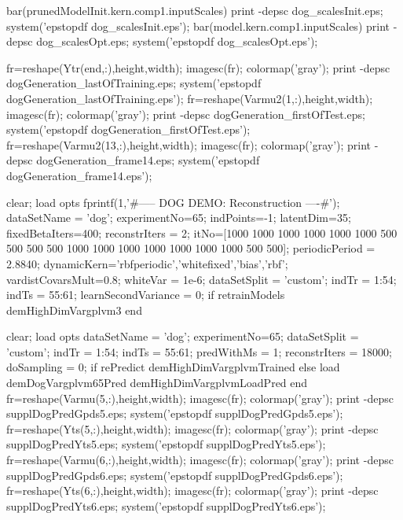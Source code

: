 \begin{matlab}
bar(prunedModelInit.kern.comp{1}.inputScales)
print -depsc dog_scalesInit.eps; system('epstopdf dog_scalesInit.eps');
bar(model.kern.comp{1}.inputScales)
print -depsc dog_scalesOpt.eps; system('epstopdf dog_scalesOpt.eps');

fr=reshape(Ytr(end,:),height,width); imagesc(fr); colormap('gray'); %
print -depsc dogGeneration_lastOfTraining.eps; system('epstopdf dogGeneration_lastOfTraining.eps');
fr=reshape(Varmu2(1,:),height,width); imagesc(fr); colormap('gray');  %
print -depsc dogGeneration_firstOfTest.eps; system('epstopdf dogGeneration_firstOfTest.eps');
fr=reshape(Varmu2(13,:),height,width); imagesc(fr); colormap('gray'); %
print -depsc dogGeneration_frame14.eps; system('epstopdf dogGeneration_frame14.eps');




clear; load opts
fprintf(1,'\n\n#-----  DOG DEMO: Reconstruction ----#\n');
dataSetName = 'dog';
experimentNo=65;
indPoints=-1; latentDim=35;
fixedBetaIters=400;
reconstrIters = 2;
itNo=[1000 1000 1000 1000 1000 1000 500 500 500 500 1000 1000 1000 1000 1000 1000 1000 500 500]; %
periodicPeriod = 2.8840;
dynamicKern={'rbfperiodic','whitefixed','bias','rbf'};
vardistCovarsMult=0.8;
whiteVar = 1e-6;
dataSetSplit = 'custom';
indTr = 1:54;
indTs = 55:61;
learnSecondVariance = 0;
if retrainModels
    demHighDimVargplvm3
end


clear; load opts
dataSetName = 'dog';
experimentNo=65;
dataSetSplit = 'custom';
indTr = 1:54; indTs = 55:61;
predWithMs = 1; %
reconstrIters = 18000; 
doSampling = 0;
if rePredict
    demHighDimVargplvmTrained
else
    load demDogVargplvm65Pred
    demHighDimVargplvmLoadPred
end
fr=reshape(Varmu(5,:),height,width); imagesc(fr); colormap('gray'); 
print -depsc supplDogPredGpds5.eps; system('epstopdf supplDogPredGpds5.eps');
fr=reshape(Yts(5,:),height,width); imagesc(fr); colormap('gray'); 
print -depsc supplDogPredYts5.eps; system('epstopdf supplDogPredYts5.eps');
fr=reshape(Varmu(6,:),height,width); imagesc(fr); colormap('gray'); 
print -depsc supplDogPredGpds6.eps; system('epstopdf supplDogPredGpds6.eps');
fr=reshape(Yts(6,:),height,width); imagesc(fr); colormap('gray'); 
print -depsc supplDogPredYts6.eps; system('epstopdf supplDogPredYts6.eps');


\end{matlab}
